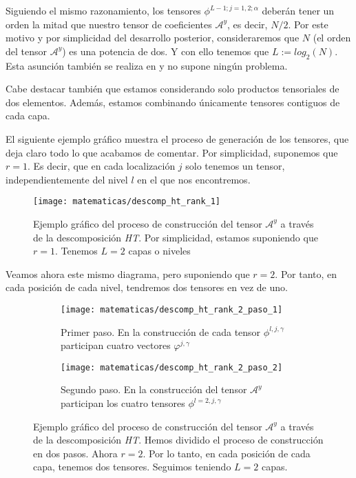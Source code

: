Siguiendo el mismo razonamiento, los tensores $\phi^{L-1; j = 1, 2; \alpha}$ deberán tener un orden la mitad que nuestro tensor de coeficientes $\mathcal{A}^y$, es decir, $N / 2$. Por este motivo y por simplicidad del desarrollo posterior, consideraremos que $N$ (el orden del tensor $\mathcal{A}^y$) es una potencia de dos. Y con ello tenemos que $L := log_2(N)$. Esta asunción también se realiza en \cite{matematicas:descomposicion_ht} y no supone ningún problema.

Cabe destacar también que estamos considerando solo productos tensoriales de dos elementos. Además, estamos combinando únicamente tensores contiguos de cada capa.

El siguiente ejemplo gráfico muestra el proceso de generación de los tensores, que deja claro todo lo que acabamos de comentar. Por simplicidad, suponemos que $r = 1$. Es decir, que en cada localización $j$ solo tenemos un tensor, independientemente del nivel $l$ en el que nos encontremos.

\begin{figure}[H]
    \centering
    \texttt{[image: matematicas/descomp\_ht\_rank\_1]}
    \caption{Ejemplo gráfico del proceso de construcción del tensor $\mathcal{A}^y$ a través de la descomposición \textit{HT}. Por simplicidad, estamos suponiendo que $r = 1$. Tenemos $L = 2$ capas o niveles}
    \label{img:diagrama_ht_simple}
\end{figure}

Veamos ahora este mismo diagrama, pero suponiendo que $r = 2$. Por tanto, en cada posición de cada nivel, tendremos dos tensores en vez de uno.

\begin{figure}[H]
    \centering
    \ajustarsubcaptions
    \begin{subfigure}{.5\textwidth}
        \centering
        \texttt{[image: matematicas/descomp\_ht\_rank\_2\_paso\_1]}
        \caption{Primer paso. En la construcción de cada tensor $\phi^{l, j, \gamma}$ participan cuatro vectores $\varphi^{j, \gamma}$}
    \end{subfigure}%
    \begin{subfigure}{.5\textwidth}
        \centering
        \texttt{[image: matematicas/descomp\_ht\_rank\_2\_paso\_2]}
        \caption{Segundo paso. En la construcción del tensor $\mathcal{A}^y$ participan los cuatro tensores $\phi^{l=2, j, \gamma}$}
    \end{subfigure}
    \caption{Ejemplo gráfico del proceso de construcción del tensor $\mathcal{A}^y$ a través de la descomposición \textit{HT}. Hemos dividido el proceso de construcción en dos pasos. Ahora $r = 2$. Por lo tanto, en cada posición de cada capa, tenemos dos tensores. Seguimos teniendo $L = 2$ capas. }
    \label{img:diagrama_ht_complejo}
\end{figure}

